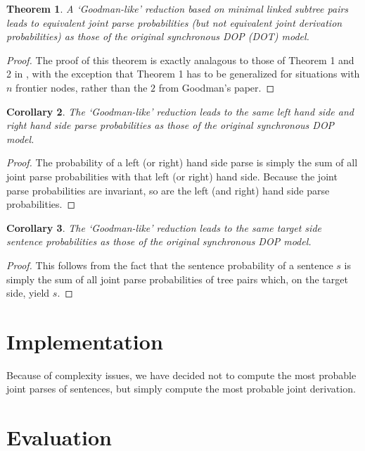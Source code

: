 \documentclass[a4paper]{article}
\newtheorem{theorem}{Theorem}[section]
\newtheorem{corollary}[theorem]{Corollary}
\theoremstyle{definition}
\begin{document}
\begin{theorem}
A `Goodman-like' reduction based on minimal linked subtree pairs leads to
equivalent joint parse probabilities (but not equivalent joint derivation
probabilities) as those of the original synchronous DOP (DOT) model.
\end{theorem}

\begin{proof}
The proof of this theorem is exactly analagous to those of Theorem 1 and 2 in \citet{goodman2003efficient}, with the exception that Theorem 1 has to be generalized for
situations with $n$ frontier nodes, rather than the $2$ from Goodman's paper.
\end{proof}

\begin{corollary}
The `Goodman-like' reduction leads to the same left hand side and right hand side parse probabilities as those of the original synchronous DOP model.
\end{corollary}

\begin{proof}
The probability of a left (or right) hand side parse is simply the sum of all joint parse
probabilities with that left (or right) hand side. Because the joint parse probabilities are invariant, so are the left (and right) hand side parse probabilities.
\end{proof}

\begin{corollary}
The `Goodman-like' reduction leads to the same target side sentence probabilities as those of the original synchronous DOP model.
\end{corollary}

\begin{proof}
This follows from the fact that the sentence probability of a sentence $s$ is simply the sum of all joint parse probabilities of tree pairs which, on the target side, yield $s$.
\end{proof}

\section{Implementation}

Because of complexity issues, we have decided not to compute the most probable joint parses of sentences, but simply compute the most probable joint derivation.

\label{sec:implem}

\section{Evaluation}
\label{sec:eval}
\end{document}
